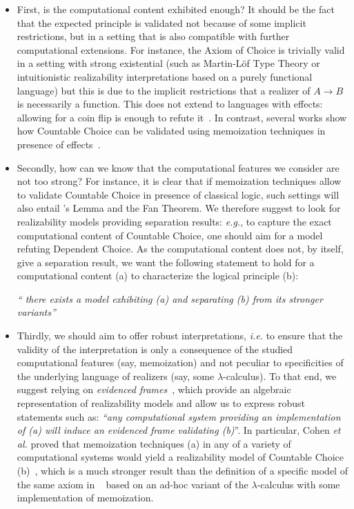 \documentclass[a4paper,UKenglish,cleveref, autoref, thm-restate]{lipics-v2021}
\begin{document}
\begin{itemize}
\item First, is the computational content exhibited enough? It should be the fact that the expected principle is validated not because of some implicit restrictions, but in a setting that is also compatible with further computational extensions.
For instance, the Axiom of Choice is trivially valid in a setting with strong existential (such as Martin-Löf Type Theory or intuitionistic realizability interpretations based on a purely functional language) but this is due to the implicit restrictions that a realizer of $A\to B$ is necessarily a function. This does not extend to languages with effects: allowing for a coin flip is enough to refute it~\cite{CohFarTat19}. In contrast, several works show how Countable Choice can be validated using memoization techniques in presence of effects~\cite{BerBezCoq98,Herbelin12,Miquey18a,CohFarTat19}.

\item Secondly, how can we know that the computational features we consider are not too strong? For instance, it is clear that if memoization techniques allow to validate Countable Choice in presence of classical logic, such settings will also entail \Konig's Lemma and the Fan Theorem. We therefore suggest to look for realizability models providing separation results: \emph{e.g.}, to capture the exact computational content of Countable Choice, one should aim for a model refuting Dependent Choice. As the computational content does not, by itself, give a separation result, we want the following statement to hold for a computational content (a) to characterize the logical principle (b):
\begin{center}
\emph{`` there exists a model exhibiting (a) and separating (b) from its stronger variants''}
\end{center}

\item Thirdly, we should aim to offer robust interpretations, \emph{i.e.} to ensure that the validity of the interpretation is only a consequence of the studied computational features (say, memoization) and not peculiar to specificities of the underlying language of realizers (say, some $\lambda$-calculus). To that end, we suggest relying on \emph{evidenced frames}~\cite{CohMiqTat21}, which provide an algebraic representation of realizability models and allow us to express robust statements such as:
\emph{``any computational system providing an implementation of \emph{(a)} will induce an evidenced frame validating \emph{(b)}}''. In particular, Cohen \emph{et al.} proved that memoization techniques (a) in any of a variety of computational systems would yield a realizability model of Countable Choice (b)~\cite{CohFarTat19,CohMiqTat21}, which is a much stronger result than the definition of a specific model of the same axiom in ~\cite{Herbelin12,Miquey18a} based on an ad-hoc variant of the $\lambda$-calculus with some implementation of memoization.
\end{itemize}
\end{document}
